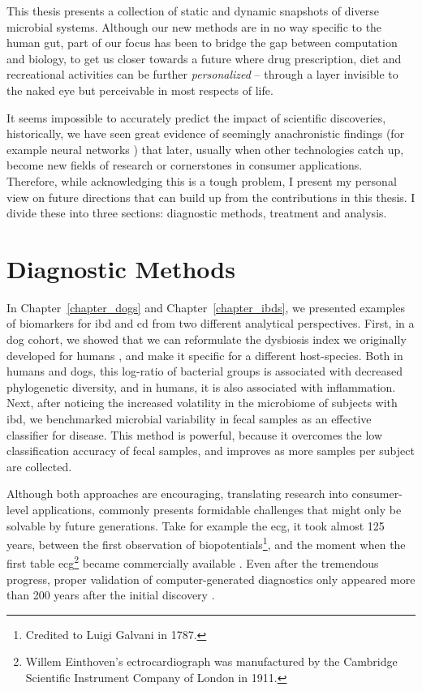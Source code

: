 This thesis presents a collection of static and dynamic snapshots of diverse
microbial systems. Although our new methods are in no way specific to the human
gut, part of our focus has been to bridge the gap between computation and
biology, to get us closer towards a future where drug prescription, diet and
recreational activities can be further \textit{personalized} -- through a layer
invisible to the naked eye but perceivable in most respects of life.

It seems impossible to accurately predict the impact of scientific discoveries, 
historically, we have seen great evidence of seemingly anachronistic findings 
(for example neural networks \cite{Tem10}) that later, usually when other 
technologies catch up, become new fields of research or cornerstones in 
consumer applications.  Therefore, while acknowledging this is a tough problem, 
I present my personal view on future directions that can build up from the 
contributions in this thesis. I divide these into three sections: diagnostic 
methods, treatment and analysis.

\section{Diagnostic Methods}

In Chapter~\ref{chapter_dogs} and Chapter~\ref{chapter_ibds}, we presented
examples of biomarkers for \gls{ibd} and \gls{cd} from two different analytical 
perspectives.  First, in a dog cohort, we showed that we can reformulate the 
dysbiosis index we originally developed for humans \cite{Gevers2014}, and make 
it specific for a different host\hyp{}species. Both in humans and dogs, this 
log-ratio of bacterial groups is associated with decreased phylogenetic 
diversity, and in humans, it is also associated with inflammation.  Next, after 
noticing the increased volatility in the microbiome of subjects with \gls{ibd}, 
we benchmarked microbial variability in fecal samples as an effective 
classifier for disease.  This method is powerful, because it overcomes the low 
classification accuracy of fecal samples, and improves as more samples per 
subject are collected.

Although both approaches are encouraging, translating research into 
consumer\hyp{}level applications, commonly presents formidable challenges that 
might only be solvable by future generations.  Take for example the \gls{ecg}, 
it took almost 125 years, between the first observation of 
biopotentials\footnote{Credited to Luigi Galvani in 1787.}, and the moment when 
the first table \gls{ecg}\footnote{Willem Einthoven's ectrocardiograph was 
manufactured by the Cambridge Scientific Instrument Company of London in 1911.} 
became commercially available \cite{ECGZywietz}. Even after the tremendous 
progress, proper validation of computer-generated diagnostics only appeared 
more than 200 years after the initial discovery \cite{njem_ecg}.

